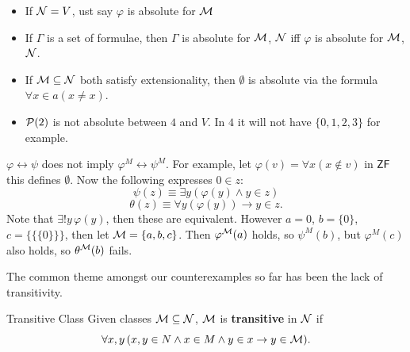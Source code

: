 \documentclass{article}
\begin{document}
\begin{exs*}
    \begin{itemize}
        \item If $\mathcal{N} = V$, ust say $\varphi$ is absolute for $\mathcal{M}$
        \item If $\Gamma$ is a set of formulae, then $\Gamma$ is absolute for $\mathcal{M}$, $\mathcal{N}$ iff $\varphi$ is absolute for $\mathcal{M}$, $\mathcal{N}$.
    \end{itemize}
\end{exs*}
\begin{ex*}
    \begin{itemize}
        \item If $\mathcal{M} \subseteq \mathcal{N}$ both satisfy extensionality, then $\emptyset$ is absolute via the formula $\forall x \in a (x \neq x)$.
        \item $\mathcal{P}(2)$ is not absolute between $4$ and $V$. In $4$ it will not have $\{0,1,2,3\}$ for example.
    \end{itemize}
\end{ex*}
\begin{ex*}
    $\varphi \leftrightarrow \psi$ does not imply $\varphi^{M} \leftrightarrow \psi^{M}$. For example, let $\varphi(v) = \forall x (x \notin v)$ in $\mathsf{ZF}$ this defines $\emptyset$. Now the following expresses $0 \in z$: \[ \psi(z) \equiv \exists y ( \varphi(y) \wedge y \in z)\]
    \[\theta(z) \equiv \forall y (\varphi(y)) \rightarrow y \in z.\]
    Note that $\exists ! y \, \varphi(y)$, then these are equivalent. However $a=0$, $b=\{0\}$, $c=\{\{\{0\}\}\}$, then let $\mathcal{M} = \{a,b,c\}$. Then $\varphi^{\mathcal{M}}(a)$ holds, so $\psi^{M}(b)$, but $\varphi^{M}(c)$ also holds, so $\theta^{\mathcal{M}}(b)$ fails.
\end{ex*}
The common theme amongst our counterexamples so far has been the lack of transitivity. \begin{fancydefine}{Transitive Class}
    Given classes $\mathcal{M} \subseteq \mathcal{N}$, $\mathcal{M}$ is \textbf{transitive} in $\mathcal{N}$ if \[ \forall x, y \, (x,y \in N \wedge x \in M \wedge y \in x \rightarrow y \in \mathcal{M}).\]

\end{fancydefine}
\end{document}
